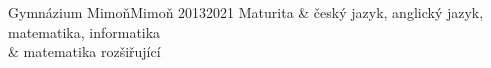 \begin{center}
	\vspace{15pt}

	\begin{school}{Gymnázium Mimoň}{}{Mimoň}
		{}{2013\rangedash{}2021}
		Maturita & český jazyk, anglický jazyk, matematika, informatika \\
									 & matematika rozšiřující
	\end{school}

	\nocite{*}
	\renewcommand{\refname}{\IfLanguageName{czech}{Publikace}{Publications}}


	

	\section{}


\end{center}
